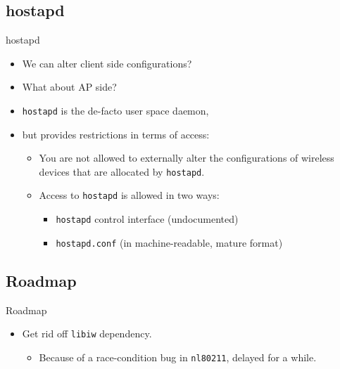 \documentclass[turkish,12pt,red,compress,mathserif]{beamer}
\begin{document}

\subsection{hostapd}

\begin{frame}{hostapd}
  \begin{itemize}
  \item We can alter client side configurations?
  \item What about AP side?
  \item \texttt{hostapd} is the de-facto user space daemon,
  \item but provides restrictions in terms of access:
    \begin{itemize}
    \item You are not allowed to externally alter the configurations of wireless
      devices that are allocated by \texttt{hostapd}.
    \item Access to \texttt{hostapd} is allowed in two ways:
      \begin{itemize}
      \item \texttt{hostapd} control interface (undocumented)
      \item \texttt{hostapd.conf} (in machine-readable, mature format)
      \end{itemize}
    \end{itemize}
  \end{itemize}
\end{frame}


\subsection{Roadmap}

\begin{frame}{Roadmap}
  \begin{itemize}
  \item Get rid off \texttt{libiw} dependency.
    \begin{itemize}
    \item Because of a race-condition bug in \texttt{nl80211}, delayed for a
      while.
    \end{itemize}
  \end{itemize}
\end{frame}
\end{document}

